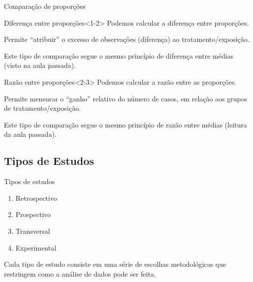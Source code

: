 \documentclass{beamer}
\begin{document}
\begin{frame}{\scriptsize Comparação de proporções}
  \begin{block}{Diferença entre proporções}<1-2>
    \scriptsize
    Podemos calcular a diferença entre proporções.

    \bigskip
    Permite ``atribuir'' o \alert{excesso} de observações (diferença) ao tratamento/exposição.

    \bigskip
    \tiny
    Este tipo de comparação segue o mesmo princípio de diferença entre médias (visto na aula passada).
  \end{block}
  \bigskip
  \begin{block}{Razão entre proporções}<2-3>
    \scriptsize
    Podemos calcular a razão entre as proporções.

    \bigskip
    Permite mensurar o ``ganho'' \alert{relativo} do número de casos, em relação aos grupos de tratamento/exposição.

    \bigskip
    \tiny
    Este tipo de comparação segue o mesmo princípio de razão entre médias (leitura da aula passada).
  \bigskip
  \begin{center}
  \end{center}
  \end{block}
\end{frame}

\subsection{Tipos de Estudos}

\begin{frame}{\scriptsize Tipos de estudos}
  \begin{enumerate}
    \footnotesize
  \item Retrospectivo
  \item Prospectivo
  \item Transversal
  \item Experimental
  \end{enumerate}
  \begin{block}{}
    \footnotesize
    Cada tipo de estudo consiste em uma série de escolhas metodológicas que restringem como a análise de dados pode ser feita.
  \end{block}
\end{frame}
\end{document}
